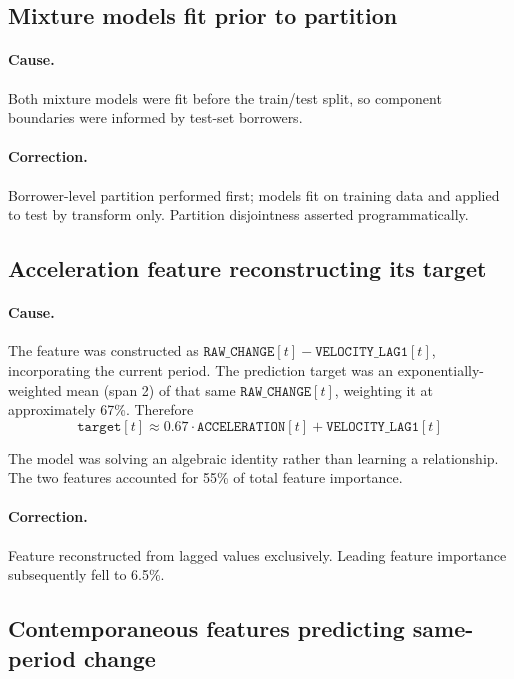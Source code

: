\documentclass[11pt,a4paper]{article}
\begin{document}
\subsection{Mixture models fit prior to partition}

\paragraph{Cause.} Both mixture models were fit before the train/test split, so component
boundaries were informed by test-set borrowers.

\paragraph{Correction.} Borrower-level partition performed first; models fit on training
data and applied to test by transform only. Partition disjointness asserted
programmatically.

\subsection{Acceleration feature reconstructing its target}

\paragraph{Cause.} The feature was constructed as
$\texttt{RAW\_CHANGE}[t] - \texttt{VELOCITY\_LAG1}[t]$, incorporating the current period.
The prediction target was an exponentially-weighted mean (span 2) of that same
$\texttt{RAW\_CHANGE}[t]$, weighting it at approximately 67\%. Therefore
\begin{equation}
\texttt{target}[t] \approx 0.67 \cdot \texttt{ACCELERATION}[t] + \texttt{VELOCITY\_LAG1}[t]
\end{equation}

The model was solving an algebraic identity rather than learning a relationship. The two
features accounted for 55\% of total feature importance.

\paragraph{Correction.} Feature reconstructed from lagged values exclusively. Leading
feature importance subsequently fell to 6.5\%.

\subsection{Contemporaneous features predicting same-period change}
\label{sec:contemporaneous}
\end{document}

